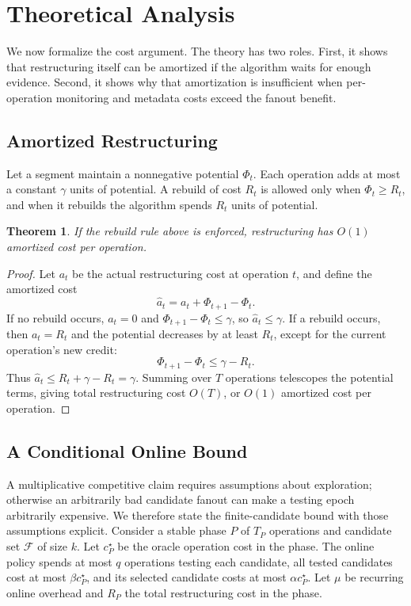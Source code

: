 \documentclass[sigconf,review,anonymous]{acmart}
\newtheorem{theorem}{Theorem}
\begin{document}
\section{Theoretical Analysis}

We now formalize the cost argument.  The theory has two roles.  First, it
shows that restructuring itself can be amortized if the algorithm waits for
enough evidence.  Second, it shows why that amortization is insufficient when
per-operation monitoring and metadata costs exceed the fanout benefit.

\subsection{Amortized Restructuring}

Let a segment maintain a nonnegative potential \(\Phi_t\).  Each operation
adds at most a constant \(\gamma\) units of potential.  A rebuild of cost
\(R_t\) is allowed only when \(\Phi_t \ge R_t\), and when it rebuilds the
algorithm spends \(R_t\) units of potential.

\begin{theorem}
If the rebuild rule above is enforced, restructuring has \(O(1)\) amortized
cost per operation.
\end{theorem}

\begin{proof}
Let \(a_t\) be the actual restructuring cost at operation \(t\), and define
the amortized cost
\[
  \hat{a}_t = a_t + \Phi_{t+1}-\Phi_t .
\]
If no rebuild occurs, \(a_t=0\) and \(\Phi_{t+1}-\Phi_t\le\gamma\), so
\(\hat{a}_t\le\gamma\).  If a rebuild occurs, then \(a_t=R_t\) and the
potential decreases by at least \(R_t\), except for the current operation's
new credit:
\[
  \Phi_{t+1}-\Phi_t \le \gamma - R_t .
\]
Thus \(\hat{a}_t \le R_t+\gamma-R_t=\gamma\).  Summing over \(T\)
operations telescopes the potential terms, giving total restructuring cost
\(O(T)\), or \(O(1)\) amortized cost per operation.
\end{proof}

\subsection{A Conditional Online Bound}

A multiplicative competitive claim requires assumptions about exploration;
otherwise an arbitrarily bad candidate fanout can make a testing epoch
arbitrarily expensive.  We therefore state the finite-candidate bound with
those assumptions explicit.  Consider a stable phase \(P\) of \(T_P\)
operations and candidate set \(\mathcal F\) of size \(k\).  Let \(c_P^\star\)
be the oracle operation cost in the phase.  The online policy spends at most
\(q\) operations testing each candidate, all tested candidates cost at most
\(\beta c_P^\star\), and its selected candidate costs at most
\(\alpha c_P^\star\).  Let \(\mu\) be recurring online overhead and \(R_P\)
the total restructuring cost in the phase.
\end{document}
